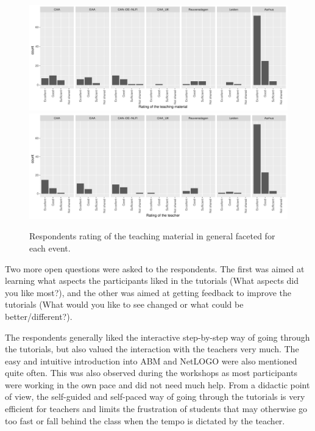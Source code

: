 \documentclass[
]{article}
\begin{document}
\begin{figure}
\includegraphics[height=0.5\textheight]{paper_files/figure-latex/rating-teaching-1} \includegraphics[height=0.5\textheight]{paper_files/figure-latex/rating-teaching-2} \caption{Respondents rating of the teaching material in general faceted for each event.}\label{fig:rating-teaching}
\end{figure}

Two more open questions were asked to the respondents. The first was aimed at learning what aspects the participants liked in the tutorials (What aspects did you like most?), and the other was aimed at getting feedback to improve the tutorials (What would you like to see changed or what could be better/different?).

The respondents generally liked the interactive step-by-step way of going through the tutorials, but also valued the interaction with the teachers very much. The easy and intuitive introduction into ABM and NetLOGO were also mentioned quite often. This was also observed during the workshops as most participants were working in the own pace and did not need much help. From a didactic point of view, the self-guided and self-paced way of going through the tutorials is very efficient for teachers and limits the frustration of students that may otherwise go too fast or fall behind the class when the tempo is dictated by the teacher.
\end{document}
